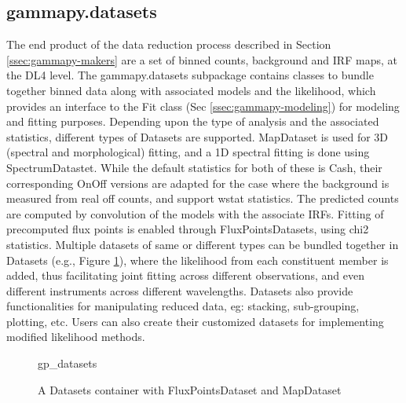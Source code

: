 \subsection{gammapy.datasets}
\label{ssec:gammapy-datasets}

The end product of the data reduction process described in Section
\ref{ssec:gammapy-makers} are a set of binned counts, background and IRF maps,
at the DL4 level. The gammapy.datasets subpackage contains classes to bundle
together binned data along with associated models and the likelihood, which
provides an interface to the Fit class (Sec \ref{ssec:gammapy-modeling}) for
modeling and fitting purposes. Depending upon the type of analysis and the
associated statistics, different types of Datasets are supported. MapDataset is
used for 3D (spectral and morphological) fitting, and a 1D spectral fitting is
done using SpectrumDatastet. While the default statistics for both of these is
Cash, their corresponding OnOff versions are adapted for the case where the
background is measured from real off counts, and support wstat statistics. The
predicted counts are computed by convolution of the models with the associate
IRFs. Fitting of precomputed flux points is enabled through FluxPointsDatasets,
using chi2 statistics. Multiple datasets of same or different types can be
bundled together in Datasets (e.g., Figure \ref{fig*:minted:gp_datasets}),
where the likelihood from each constituent member is added, thus facilitating
joint fitting across different observations, and even different instruments
across different wavelengths. Datasets also provide functionalities for
manipulating reduced data, eg: stacking, sub-grouping, plotting, etc. Users can
also create their customized datasets for implementing modified likelihood
methods.

\begin{figure}
	{gp_datasets}
	\caption{A Datasets container with FluxPointsDataset and MapDataset}
	\label{fig*:minted:gp_datasets}
\end{figure}
